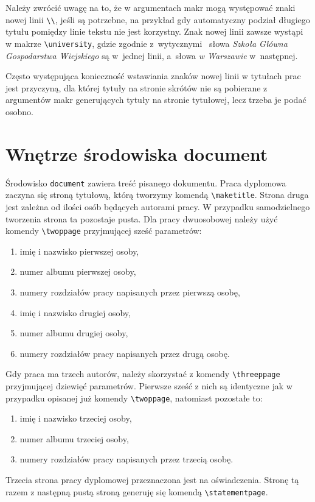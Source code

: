 \documentclass{SGGW-thesis}
\begin{document}
Należy zwrócić uwagę na to, że w argumentach makr mogą występować znaki nowej linii \verb|\\|, jeśli są potrzebne, na przykład gdy automatyczny podział długiego tytułu
pomiędzy linie tekstu nie jest korzystny. Znak nowej linii zawsze wystąpi w makrze \verb|\university|, gdzie zgodnie z~wytycznymi~\cite{wymagania} słowa {\em Szkoła Główna
Gospodarstwa Wiejskiego} są w~jednej linii, a~słowa {\em w Warszawie} w~następnej.

Często występująca konieczność wstawiania znaków nowej linii w tytułach prac jest przyczyną, dla której tytuły na stronie skrótów nie są pobierane z argumentów makr
generujących tytuły na stronie tytułowej, lecz trzeba je podać  osobno.


\section{Wnętrze środowiska document}
\label{sec:srodowisko-document}
Środowisko \verb|document| zawiera treść pisanego dokumentu. Praca dyplomowa zaczyna się stroną tytułową, którą tworzymy komendą \verb|\maketitle|. Strona druga jest zależna
od ilości osób będących autorami pracy. W przypadku samodzielnego tworzenia strona ta pozostaje pusta. Dla pracy dwuosobowej należy użyć komendy \verb|\twoppage| przyjmującej
sześć parametrów:
\begin{enumerate}
\item{imię i nazwisko pierwszej osoby,}
\item{numer albumu pierwszej osoby,}
\item{numery rozdziałów pracy napisanych przez pierwszą osobę,}
\item{imię i nazwisko drugiej osoby,}
\item{numer albumu drugiej osoby,}
\item{numery rozdziałów pracy napisanych przez drugą osobę.}
\end{enumerate}
Gdy praca ma trzech autorów, należy skorzystać z komendy \verb|\threeppage| przyjmującej dziewięć parametrów. Pierwsze sześć z nich są identyczne jak w przypadku opisanej już
komendy \verb|\twoppage|, natomiast pozostałe to:
\begin{enumerate}\addtocounter{enumi}{6}
\item{imię i nazwisko trzeciej osoby,}
\item{numer albumu trzeciej osoby,}
\item{numery rozdziałów pracy napisanych przez trzecią osobę.}
\end{enumerate}
Trzecia strona pracy dyplomowej przeznaczona jest na oświadczenia. Stronę tą razem z następną pustą stroną generuję się komendą \verb|\statementpage|.
\end{document}
